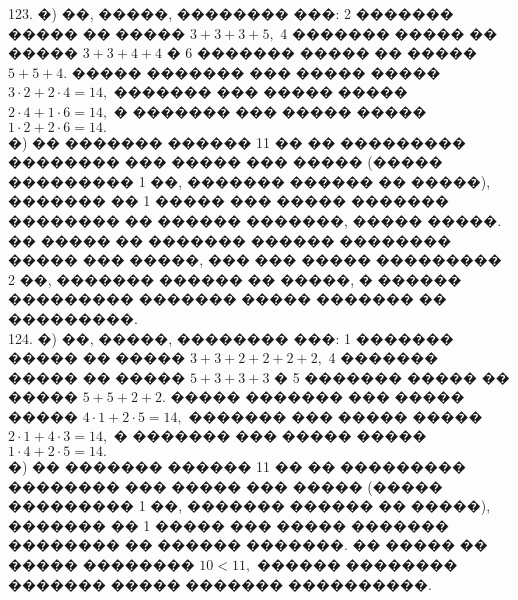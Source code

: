 \documentclass[12pt]{article}
\begin{document}
123. �) ��, �����, �������� ���: 2 ������� ����� �� ����� $3+3+3+5,$ 4 ������� ����� �� ����� $3+3+4+4$ � 6 ������� ����� �� ����� $5+5+4.$ ����� ������� ��� ����� ����� $3\cdot2+2\cdot4=14,$ ������� ��� ����� ����� $2\cdot4+1\cdot6=14,$ � ������� ��� ����� ����� $1\cdot2+2\cdot6=14.$\\
�) �� ������� ������ 11 �� �� ��������� �������� ��� ����� ��� ����� (����� ��������� 1 ��, ������� ������ �� �����), ������� �� 1 ����� ��� ����� ������� �������� �� ������ �������, ����� �����. �� ����� �� ������� ������ �������� ����� ��� �����, ��� ��� ����� ��������� 2 ��, ������� ������ �� �����, � ������ ��������� ������� ����� ������� �� ���������.\\
124. �) ��, �����, �������� ���: 1 ������� ����� �� ����� $3+3+2+2+2+2,$ 4 ������� ����� �� ����� $5+3+3+3$ � 5 ������� ����� �� ����� $5+5+2+2.$ ����� ������� ��� ����� ����� $4\cdot1+2\cdot5=14,$ ������� ��� ����� ����� $2\cdot1+4\cdot3=14,$ � ������� ��� ����� ����� $1\cdot4+2\cdot5=14.$\\
�) �� ������� ������ 11 �� �� ��������� �������� ��� ����� ��� ����� (����� ��������� 1 ��, ������� ������ �� �����), ������� �� 1 ����� ��� ����� ������� �������� �� ������ �������. �� ����� �� ����� �������� $10<11,$ ������ �������� ������� ����� ������� ����������.
\newpage
\end{document}
